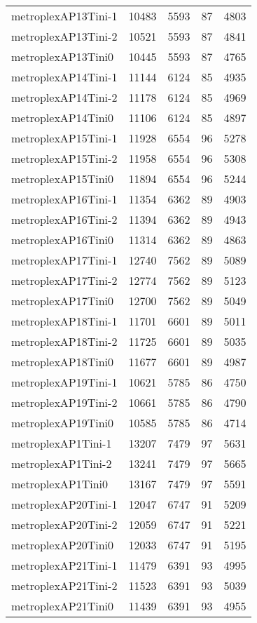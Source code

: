 \documentclass[../../../thesis.tex]{subfiles}
\begin{document}
\begin{longtable}{lrrrr}
metroplexAP13Tini-1 & 10483 & 5593 & 87 & 4803 \\
metroplexAP13Tini-2 & 10521 & 5593 & 87 & 4841 \\
metroplexAP13Tini0 & 10445 & 5593 & 87 & 4765 \\
metroplexAP14Tini-1 & 11144 & 6124 & 85 & 4935 \\
metroplexAP14Tini-2 & 11178 & 6124 & 85 & 4969 \\
metroplexAP14Tini0 & 11106 & 6124 & 85 & 4897 \\
metroplexAP15Tini-1 & 11928 & 6554 & 96 & 5278 \\
metroplexAP15Tini-2 & 11958 & 6554 & 96 & 5308 \\
metroplexAP15Tini0 & 11894 & 6554 & 96 & 5244 \\
metroplexAP16Tini-1 & 11354 & 6362 & 89 & 4903 \\
metroplexAP16Tini-2 & 11394 & 6362 & 89 & 4943 \\
metroplexAP16Tini0 & 11314 & 6362 & 89 & 4863 \\
metroplexAP17Tini-1 & 12740 & 7562 & 89 & 5089 \\
metroplexAP17Tini-2 & 12774 & 7562 & 89 & 5123 \\
metroplexAP17Tini0 & 12700 & 7562 & 89 & 5049 \\
metroplexAP18Tini-1 & 11701 & 6601 & 89 & 5011 \\
metroplexAP18Tini-2 & 11725 & 6601 & 89 & 5035 \\
metroplexAP18Tini0 & 11677 & 6601 & 89 & 4987 \\
metroplexAP19Tini-1 & 10621 & 5785 & 86 & 4750 \\
metroplexAP19Tini-2 & 10661 & 5785 & 86 & 4790 \\
metroplexAP19Tini0 & 10585 & 5785 & 86 & 4714 \\
metroplexAP1Tini-1 & 13207 & 7479 & 97 & 5631 \\
metroplexAP1Tini-2 & 13241 & 7479 & 97 & 5665 \\
metroplexAP1Tini0 & 13167 & 7479 & 97 & 5591 \\
metroplexAP20Tini-1 & 12047 & 6747 & 91 & 5209 \\
metroplexAP20Tini-2 & 12059 & 6747 & 91 & 5221 \\
metroplexAP20Tini0 & 12033 & 6747 & 91 & 5195 \\
metroplexAP21Tini-1 & 11479 & 6391 & 93 & 4995 \\
metroplexAP21Tini-2 & 11523 & 6391 & 93 & 5039 \\
metroplexAP21Tini0 & 11439 & 6391 & 93 & 4955 \\

\end{longtable}
\end{document}
